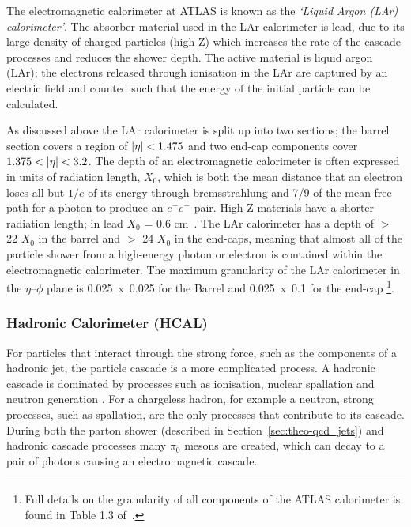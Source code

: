 The electromagnetic calorimeter at ATLAS is known as the \textit{`Liquid Argon (LAr) calorimeter'}.
The absorber material used in the LAr calorimeter is lead, due to its large density of charged particles (high Z)
which increases the rate of the cascade processes and reduces the shower depth.
The active material is liquid argon (LAr);
the electrons released through ionisation in the LAr are captured by an electric field and counted
such that the energy of the initial particle can be calculated.

As discussed above the LAr calorimeter is split up into two sections;
the barrel section covers a region of $|\eta|\nobreak<\nobreak1.475$ and two end-cap components cover $1.375\nobreak<\nobreak|\eta|\nobreak<\nobreak3.2$.
The depth of an electromagnetic calorimeter is often expressed in units of radiation length, $X_{0}$,
which is both the mean distance that an electron loses all but  $1/e$ of its energy through bremsstrahlung
and 7/9 of the mean free path for a photon to produce an $e^+e^-$ pair.
High-Z materials have a shorter radiation length; in lead $X_0$ = 0.6 cm~\cite{obj-bjets_PDG}.
The LAr calorimeter has a depth of $>$ 22 $X_{0}$ in the barrel and $>$ 24 $X_{0}$ in the end-caps,
meaning that almost all of the particle shower from a high-energy photon
or electron is contained within the electromagnetic calorimeter.
The maximum granularity of the LAr calorimeter in the $\eta$--$\phi$ plane
is \mbox{0.025~x~0.025} for the Barrel and 0.025~x~0.1 for the end-cap
\footnote{Full details on the granularity of all components of the ATLAS calorimeter is found in Table 1.3 of~\cite{det-ATLAS_Exp}.}. 

\subsubsection{Hadronic Calorimeter (HCAL)}
\label{sec:det-calo_HCAL}

For particles that interact through the strong force, such as the components of a hadronic jet,
the particle cascade is a more complicated process.
A hadronic cascade is dominated by processes such as
ionisation, nuclear spallation and neutron generation \cite{det-nuclearInt_book, det-thesis_kate}.
For a chargeless hadron, for example a neutron,
strong processes, such as spallation, are the only processes that contribute to its cascade.
During both the parton shower (described in Section~\ref{sec:theo-qcd_jets}) and hadronic cascade processes many $\pi_0$ mesons are created,
which can decay to a pair of photons causing an electromagnetic cascade. 

